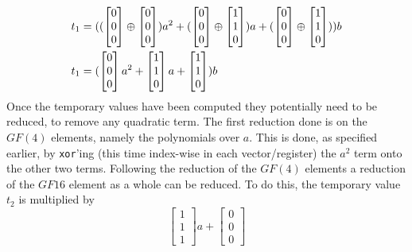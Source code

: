 \begin{equation*}
\begin{split}
        t_1 &= ((\begin{bmatrix} 0\\ 0\\ 0 \end{bmatrix} \oplus \begin{bmatrix} 0\\ 0\\ 0 \end{bmatrix})a^2 + (\begin{bmatrix} 0\\ 0\\ 0 \end{bmatrix} \oplus \begin{bmatrix} 1\\ 1\\ 0 \end{bmatrix})a + (\begin{bmatrix} 0\\ 0\\ 0 \end{bmatrix} \oplus \begin{bmatrix} 1\\ 1\\ 0 \end{bmatrix}))b\\
        t_1 &= (\begin{bmatrix} 0\\ 0\\ 0 \end{bmatrix}a^2 + \begin{bmatrix} 1\\ 1\\ 0 \end{bmatrix}a + \begin{bmatrix} 1\\ 1\\ 0 \end{bmatrix})b
    \end{split}
\end{equation*}
Once the temporary values have been computed they potentially need to be reduced, to remove any quadratic term. The first reduction done is on the $GF(4)$ elements, namely the polynomials over $a$. This is done, as specified earlier, by \texttt{xor}'ing (this time index-wise in each vector/register) the $a^2$ term onto the other two terms. Following the reduction of the $GF(4)$ elements a reduction of the $GF16$ element as a whole can be reduced. To do this, the temporary value $t_2$ is multiplied by
$$
    \begin{bmatrix}
        1\\
        1\\
        1
    \end{bmatrix}a 
    + 
    \begin{bmatrix}
        0\\
        0\\
        0
    \end{bmatrix}
$$
